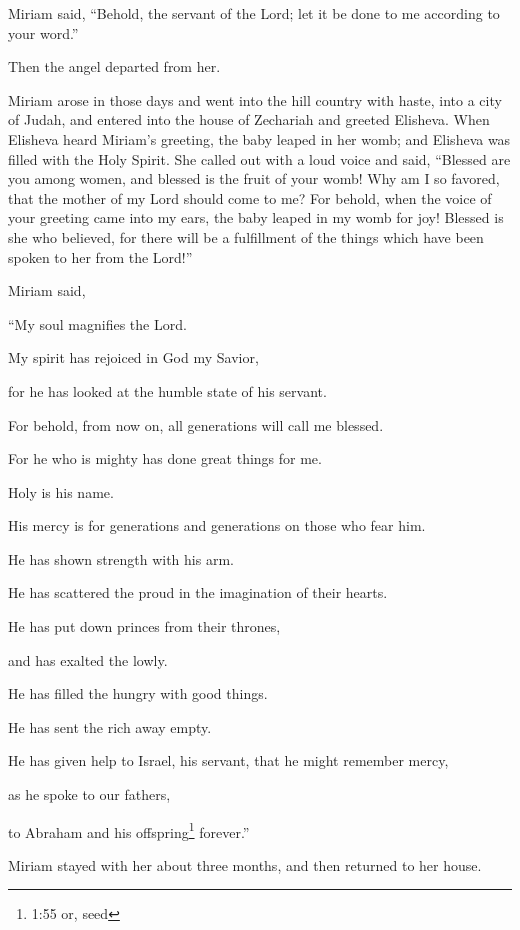 \myverse{}Miriam said, “Behold, the servant of the Lord; let it be done
to me according to your word.”

Then the angel departed from her.

\myverse{}Miriam arose in those days and went into the hill country with
haste, into a city of Judah,
\myverse{}and entered into the house of Zechariah and greeted Elisheva.
\myverse{}When Elisheva heard Miriam’s greeting, the baby leaped in her womb; and Elisheva
was filled with the Holy Spirit.
\myverse{}She called out with a loud voice and said, “Blessed are you among women, and
blessed is the fruit of your womb!
\myverse{}Why am I so favored, that the mother of my Lord should come to me?
\myverse{}For behold, when the voice of your greeting came into my ears, the baby leaped
in my womb for joy!
\myverse{}Blessed is she who believed, for there will be a fulfillment of the things
which have been spoken to her from the Lord!”

\myverse{}Miriam said,

“My soul magnifies the Lord.

\myverse{}My spirit has rejoiced in God my Savior,

\myverse{}for he has looked at the humble state of his servant.

For behold, from now on, all generations will call me blessed.

\myverse{}For he who is mighty has done great things for me.

Holy is his name.

\myverse{}His mercy is for generations and generations on those
who fear him.

\myverse{}He has shown strength with his arm.

He has scattered the proud in the imagination of their hearts.

\myverse{}He has put down princes from their thrones,

and has exalted the lowly.

\myverse{}He has filled the hungry with good things.

He has sent the rich away empty.

\myverse{}He has given help to Israel, his servant, that he might remember
mercy,

\myverse{}as he spoke to our fathers,

to Abraham and his offspring\footnote{1:55 or, seed} forever.”

\myverse{}Miriam stayed with her about three months, and then returned
to her house.

